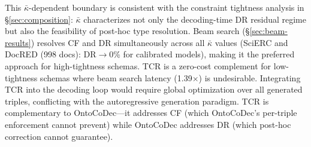 This $\bar{\kappa}$-dependent boundary is consistent with the constraint tightness analysis in \S\ref{sec:composition}: $\bar{\kappa}$ characterizes not only the decoding-time DR residual regime but also the feasibility of post-hoc type resolution.
Beam search (\S\ref{sec:beam-results}) resolves CF and DR simultaneously across all $\bar{\kappa}$ values (SciERC and DocRED (998 docs): DR$\to$0\% for calibrated models), making it the preferred approach for high-tightness schemas.
TCR is a zero-cost complement for low-tightness schemas where beam search latency (1.39$\times$) is undesirable.
Integrating TCR into the decoding loop would require global optimization over all generated triples, conflicting with the autoregressive generation paradigm.
TCR is complementary to OntoCoDec---it addresses CF (which OntoCoDec's per-triple enforcement cannot prevent) while OntoCoDec addresses DR (which post-hoc correction cannot guarantee).
